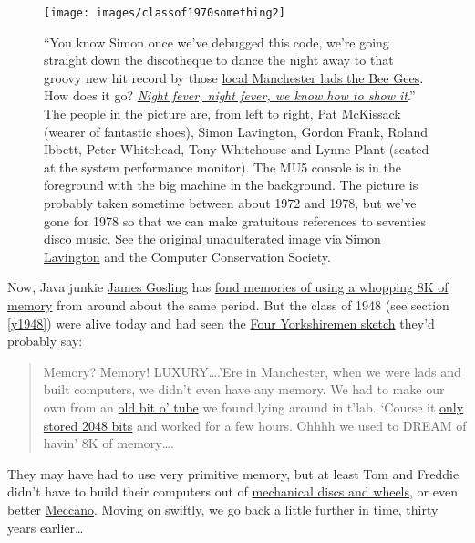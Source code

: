 \documentclass[
  12pt,
]{book}
\begin{document}
\begin{figure}

{\centering \texttt{[image: images/classof1970something2]} 

}

\caption{``You know Simon once we've debugged this code, we're going straight down the discotheque to dance the night away to that groovy new hit record by those \href{https://en.wikipedia.org/wiki/Bee_Gees}{local Manchester lads the Bee Gees}. How does it go? \emph{\href{https://en.wikipedia.org/wiki/Night_Fever}{Night fever, night fever, we know how to show it}}.'' The people in the picture are, from left to right, Pat McKissack (wearer of fantastic shoes), Simon Lavington, Gordon Frank, Roland Ibbett, Peter Whitehead, Tony Whitehouse and Lynne Plant (seated at the system performance monitor). The MU5 console is in the foreground with the big machine in the background. The picture is probably taken sometime between about 1972 and 1978, but we've gone for 1978 so that we can make gratuitous references to seventies disco music. See the original unadulterated image via \href{http://www.computinghistory.org.uk/det/3638/Simon-Lavington/}{Simon Lavington} and the Computer Conservation Society. \citep{mu5}}\label{fig:mu5-fig}
\end{figure}



Now, Java junkie \href{https://en.wikipedia.org/wiki/James_Gosling}{James Gosling} has \href{http://web.archive.org/web/20041010131526/http://today.java.net/jag/page6.html\#51}{fond memories of using a whopping 8K of memory} from around about the same period. \citep{gosling} But the class of 1948 (see section \ref{y1948}) were alive today and had seen the \href{https://en.wikipedia.org/wiki/Four_Yorkshiremen_sketch}{Four Yorkshiremen sketch} \citep{fouryorkshiremen} they'd probably say:

\begin{quote}
Memory? Memory! LUXURY\ldots.'Ere in Manchester, when we were lads and built computers, we didn't even
have any memory. We had to make our own from an \href{https://en.wikipedia.org/wiki/Williams_tube}{old bit o' tube} we found lying around in t'lab.
`Course it \href{http://curation.cs.manchester.ac.uk/computer50/www.computer50.org/mark1/ip-mm1.crt2048.html}{only stored 2048 bits} and worked for a few hours. Ohhhh we used to DREAM of havin' 8K of
memory\ldots.
\end{quote}

They may have had to use very primitive memory, but at least Tom and Freddie didn't have to build their computers out of \href{https://www.sciencemuseum.org.uk/objects-and-stories/lovelace-turing-and-invention-computers}{mechanical discs and wheels}, or even better \href{https://en.wikipedia.org/wiki/Differential_analyser\#Use_of_Meccano}{Meccano}. \citep{meccano, hartree} Moving on swiftly, we go back a little further in time, thirty years earlier\ldots{}
\end{document}

